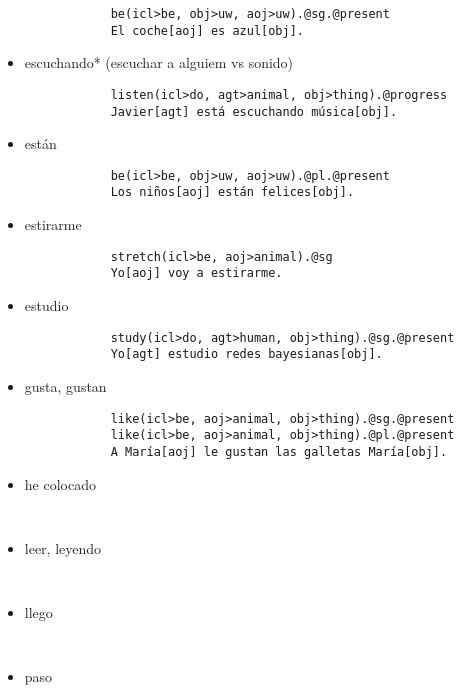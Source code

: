 \documentclass{article}
\begin{document}
\begin{itemize}
        \begin{verbatim}
            be(icl>be, obj>uw, aoj>uw).@sg.@present
            El coche[aoj] es azul[obj].
        \end{verbatim}
        \item escuchando* (escuchar a alguiem vs sonido)
        \begin{verbatim}
            listen(icl>do, agt>animal, obj>thing).@progress
            Javier[agt] está escuchando música[obj].
        \end{verbatim}
        \item están
        \begin{verbatim}
            be(icl>be, obj>uw, aoj>uw).@pl.@present
            Los niños[aoj] están felices[obj].
        \end{verbatim}
        \item estirarme
        \begin{verbatim}
            stretch(icl>be, aoj>animal).@sg
            Yo[aoj] voy a estirarme.
        \end{verbatim}
        \item estudio
        \begin{verbatim}
            study(icl>do, agt>human, obj>thing).@sg.@present
            Yo[agt] estudio redes bayesianas[obj].
        \end{verbatim}
        \item gusta, gustan
        \begin{verbatim}
            like(icl>be, aoj>animal, obj>thing).@sg.@present
            like(icl>be, aoj>animal, obj>thing).@pl.@present
            A María[aoj] le gustan las galletas María[obj].
        \end{verbatim}
        \item he colocado
        \begin{verbatim}
            
        \end{verbatim}
        \item leer, leyendo
        \begin{verbatim}
            
        \end{verbatim}
        \item llego
        \begin{verbatim}
            
        \end{verbatim}
        \item paso
        \begin{verbatim}
            

\end{verbatim}
\end{itemize}
\end{document}
